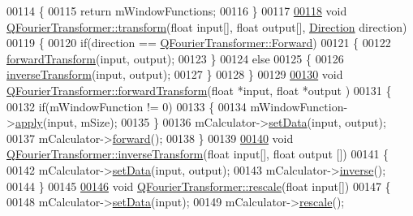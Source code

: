 \begin{DoxyCode}
00114 \{
00115     \textcolor{keywordflow}{return} mWindowFunctions;
00116 \}
00117 
\hypertarget{a00121_source_l00118}{}\hyperlink{a00054_ac86e9f35cd5313def6ef3c2bede56919}{00118} \textcolor{keywordtype}{void} \hyperlink{a00054_ac86e9f35cd5313def6ef3c2bede56919}{QFourierTransformer::transform}(\textcolor{keywordtype}{float} input[], \textcolor{keywordtype}{float} output[], 
      \hyperlink{a00054_a54933cee8b4d5f692b2a085b3b671f12}{Direction} direction)
00119 \{
00120     \textcolor{keywordflow}{if}(direction == \hyperlink{a00054_a54933cee8b4d5f692b2a085b3b671f12ad0c3ac33a7682d25b54133a6442966d1}{QFourierTransformer::Forward})
00121     \{
00122         \hyperlink{a00054_a02bee79c9e9f978ed1fb012eda58ed5d}{forwardTransform}(input, output);
00123     \}
00124     \textcolor{keywordflow}{else}
00125     \{
00126         \hyperlink{a00054_a5af8ceccf2bbe0a37be994db7181a4ca}{inverseTransform}(input, output);
00127     \}
00128 \}
00129 
\hypertarget{a00121_source_l00130}{}\hyperlink{a00054_a02bee79c9e9f978ed1fb012eda58ed5d}{00130} \textcolor{keywordtype}{void} \hyperlink{a00054_a02bee79c9e9f978ed1fb012eda58ed5d}{QFourierTransformer::forwardTransform}(\textcolor{keywordtype}{float} *input, \textcolor{keywordtype}{float} *output
      )
00131 \{
00132     \textcolor{keywordflow}{if}(mWindowFunction != 0)
00133     \{
00134         mWindowFunction->\hyperlink{a00071_aa4a4f988e1f4b65e4181a0c8c3245a00}{apply}(input, mSize);
00135     \}
00136     mCalculator->\hyperlink{a00052_a2d48438c3ee2549f8bf0e1e8fc1c3f1d}{setData}(input, output);
00137     mCalculator->\hyperlink{a00052_a77ef4fb3e16e1727a9d96ef5956c1885}{forward}();
00138 \}
00139 
\hypertarget{a00121_source_l00140}{}\hyperlink{a00054_a5af8ceccf2bbe0a37be994db7181a4ca}{00140} \textcolor{keywordtype}{void} \hyperlink{a00054_a5af8ceccf2bbe0a37be994db7181a4ca}{QFourierTransformer::inverseTransform}(\textcolor{keywordtype}{float} input[], \textcolor{keywordtype}{float} output
      [])
00141 \{
00142     mCalculator->\hyperlink{a00052_a2d48438c3ee2549f8bf0e1e8fc1c3f1d}{setData}(input, output);
00143     mCalculator->\hyperlink{a00052_a31bf1b0c412519f3e8d0af3cdf0c543b}{inverse}();
00144 \}
00145 
\hypertarget{a00121_source_l00146}{}\hyperlink{a00054_ad5e366c27b75fff9b1997673f4cb4510}{00146} \textcolor{keywordtype}{void} \hyperlink{a00054_ad5e366c27b75fff9b1997673f4cb4510}{QFourierTransformer::rescale}(\textcolor{keywordtype}{float} input[])
00147 \{
00148     mCalculator->\hyperlink{a00052_a2d48438c3ee2549f8bf0e1e8fc1c3f1d}{setData}(input);
00149     mCalculator->\hyperlink{a00052_a1f9d429995cc71729a12ce901e280fcf}{rescale}();

\end{DoxyCode}

